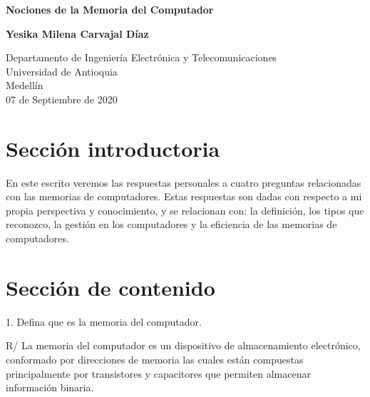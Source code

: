 \documentclass{article}
\begin{document}
\begin{titlepage}
    \begin{center}
        \vspace*{1cm}
            
        \Huge
        \textbf{Nociones de la Memoria del Computador}
            
        \vspace{0.5cm}
        \LARGE
            
        \vspace{1.5cm}
            
        \textbf{Yesika Milena Carvajal Díaz}
            
        \vfill
            
        \vspace{0.8cm}
            
        \Large
        Departamento de Ingeniería Electrónica y Telecomunicaciones\\
        Universidad de Antioquia\\
        Medellín\\
        07 de Septiembre de 2020
            
    \end{center}
\end{titlepage}

\tableofcontents

\section{Sección introductoria}

En este escrito veremos las respuestas personales a cuatro preguntas relacionadas con las memorias de computadores. Estas respuestas son dadas con respecto a mi propia perspectiva y conocimiento, y se relacionan con: la definición, los tipos que reconozco, la gestión en los computadores y la eficiencia de las memorias de computadores.

\section{Sección de contenido} \label{contenido}

\vspace{0.8cm}
1. Defina que es la memoria del computador.

\vspace{0.3cm}
R/ La memoria del computador es un dispositivo de almacenamiento electrónico, conformado por direcciones de memoria las cuales están compuestas principalmente por transistores y capacitores que permiten almacenar información binaria.
\end{document}
